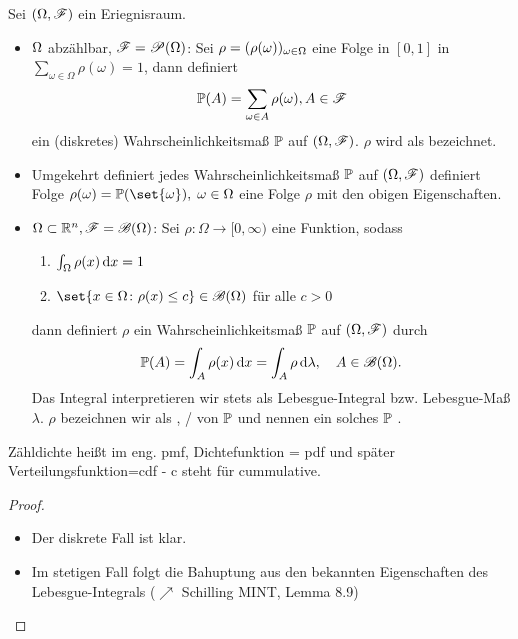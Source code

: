 \begin{proposition}
	Sei $(\Omega, \mathscr F)$ ein Eriegnisraum.
	\begin{itemize}
		\item $\Omega$ abzählbar, $\mathscr F = \mathscr{P}(\Omega)$: Sei $\rho = (\rho(\omega))_{\omega \in \Omega}$ eine Folge in $[0,1]$ in $\sum_{\omega \in \Omega} \rho(\omega) = 1$, dann definiert
		\begin{align*}
			\mathbb{P}(A) = \sum_{\omega \in A} \rho(\omega), A \in \mathscr F
		\end{align*}
		ein (diskretes) Wahrscheinlichkeitsmaß $\mathbb{P}$ auf $(\Omega, \mathscr F)$. $\rho$ wird als  bezeichnet.
		\item Umgekehrt definiert jedes Wahrscheinlichkeitsmaß $\mathbb{P}$ auf $(\Omega, \mathscr{F})$ definiert Folge $\rho(\omega) = \probp(\set{\omega}),\; \omega \in \Omega$ eine Folge $\rho$ mit den obigen Eigenschaften.
		\item $\Omega \subset \mathbb{R}^n, \mathscr{F} = \mathscr{B}(\Omega)$: Sei $\rho: \Omega \to [0, \infty)$ eine Funktion, sodass
		\begin{enumerate}
			\item $\int_{\Omega} \rho(x)\,\mathrm{d} x = 1$
			\item $\set{x \in \Omega \colon \rho(x) \le c} \in \borel(\Omega)$ für alle $c > 0$ 
		\end{enumerate}
		dann definiert $\rho$ ein Wahrscheinlichkeitsmaß $\mathbb{P}$ auf $(\Omega, \mathscr{F})$ durch 
		\begin{align}
		\mathbb{P}(A) = \int_{A} \rho(x) \,\mathrm{d} x = \int_{A} \rho \,\mathrm{d} \lambda, \quad A \in \mathscr{B}(\Omega).\notag
		\end{align}
		Das Integral interpretieren wir stets als Lebesgue-Integral bzw. Lebesgue-Maß $\lambda$.
		$\rho$ bezeichnen wir als , / von $\mathbb{P}$ und nennen ein solches $\mathbb{P}$ .
	\end{itemize}
\end{proposition}
\begin{*anmerkung}[English]
Zähldichte heißt im eng. pmf, Dichtefunktion = pdf und später Verteilungsfunktion=cdf - c steht für cummulative.
\end{*anmerkung}

\begin{proof}
	\begin{itemize}
		\item Der diskrete Fall ist klar.
		\item Im stetigen Fall folgt die Bahuptung aus den bekannten Eigenschaften des Lebesgue-Integrals ($\nearrow$ Schilling MINT, Lemma 8.9)
	\end{itemize}
\end{proof}

